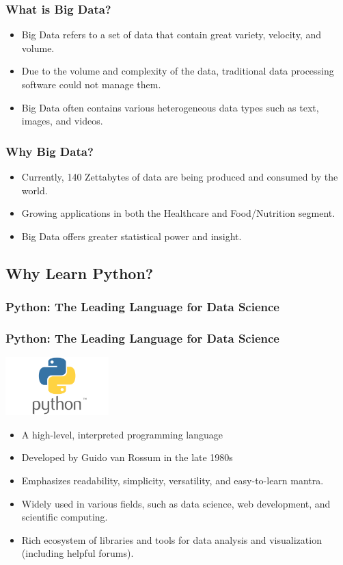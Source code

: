 \documentclass{beamer}
\begin{document}
    \begin{frame}
        \frametitle{What is Big Data?}
        \begin{itemize}
            \item Big Data refers to a set of data that contain great variety, velocity, and volume.
            \item Due to the volume and complexity of the data, traditional data processing software could not manage them.
            \item Big Data often contains various heterogeneous data types such as text, images, and videos.
        \end{itemize}
    \end{frame}
        
    \begin{frame}
        \frametitle{Why Big Data?}
        \begin{itemize}
            \item Currently, 140 Zettabytes of data are being produced and consumed by the world.
            \item Growing applications in both the Healthcare and Food/Nutrition segment.
            \item Big Data offers greater statistical power and insight.
        \end{itemize}
    \end{frame}
        
    \subsection{Why Learn Python?}
    \subsubsection{Python: The Leading Language for Data Science}
    \begin{frame}
        \frametitle{Python: The Leading Language for Data Science}
        \begin{center}
            \includegraphics[width=0.3\textwidth]{figures/Python-Symbol}
        \end{center}
        \begin{itemize}
            \item A high-level, interpreted programming language
            \item Developed by Guido van Rossum in the late 1980s
            \item Emphasizes readability, simplicity, versatility, and easy-to-learn mantra.
            \item Widely used in various fields, such as data science, web development, and scientific computing.
            \item Rich ecosystem of libraries and tools for data analysis and visualization (including helpful forums).
        \end{itemize}
    \end{frame}
        
\end{document}
